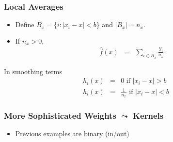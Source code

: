 \documentclass{beamer}
\numberwithin{equation}{section}
\begin{document}
\begin{frame}
\frametitle{Local Averages}

\begin{itemize}
\item Define $B_{x}  =\{i: |x_{i} - x|< b  \}$ and $|B_{x}| = n_{x}$. 
\item If $n_{x}>0$,
\begin{eqnarray}
\hat{f}(x) & = & \sum_{i \in B_{x} } \frac{Y_{i}}{n_{x}} \nonumber 
\end{eqnarray}
\end{itemize}
In smoothing terms
\begin{eqnarray}
h_{i} (x)  & = & 0 \text{ if } |x_{i} - x| >b \nonumber \\
h_{i} (x) & = & \frac{1}{n_{x}} \text{ if }  |x_{i} - x| <b  \nonumber
\end{eqnarray}


\end{frame}


\begin{frame}
\frametitle{More Sophisticated Weights $\leadsto$ Kernels}

\begin{itemize}
\item Previous examples are binary (in/out) \pause 
{} \pause 
{}

\end{itemize}



\end{frame}


\begin{frame}

\begin{center}
\end{center}

\end{frame}
\end{document}
